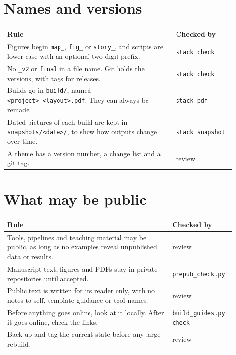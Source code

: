 \section{Names and versions}

\begin{longtable}{p{0.68\linewidth}p{0.24\linewidth}}
\toprule
Rule & Checked by \\
\midrule
Figures begin \texttt{map\_}, \texttt{fig\_} or \texttt{story\_}, and scripts are lower case with an optional two-digit prefix. & \texttt{stack check} \\
No \texttt{\_v2} or \texttt{final} in a file name. Git holds the versions, with tags for releases. & \texttt{stack check} \\
Builds go in \texttt{build/}, named \texttt{<project>\_<layout>.pdf}. They can always be remade. & \texttt{stack pdf} \\
Dated pictures of each build are kept in \texttt{snapshots/<date>/}, to show how outputs change over time. & \texttt{stack snapshot} \\
A theme has a version number, a change list and a git tag. & review \\
\bottomrule
\end{longtable}

\section{What may be public}

\begin{longtable}{p{0.68\linewidth}p{0.24\linewidth}}
\toprule
Rule & Checked by \\
\midrule
Tools, pipelines and teaching material may be public, as long as no examples reveal unpublished data or results. & review \\
Manuscript text, figures and PDFs stay in private repositories until accepted. & \texttt{prepub\_check.py} \\
Public text is written for its reader only, with no notes to self, template guidance or tool names. & review \\
Before anything goes online, look at it locally. After it goes online, check the links. & \texttt{build\_guides.py check} \\
Back up and tag the current state before any large rebuild. & review \\
\bottomrule
\end{longtable}
